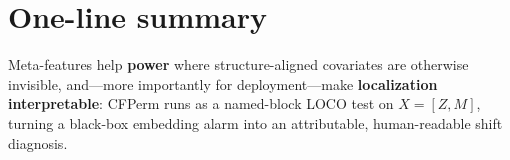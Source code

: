 \documentclass[11pt]{article}
\begin{document}
\section{One-line summary}
Meta-features help \textbf{power} where structure-aligned covariates
are otherwise invisible, and---more importantly for deployment---make
\textbf{localization interpretable}: CFPerm runs as a named-block LOCO
test on $X=[Z,M]$, turning a black-box embedding alarm into an
attributable, human-readable shift diagnosis.
\end{document}
